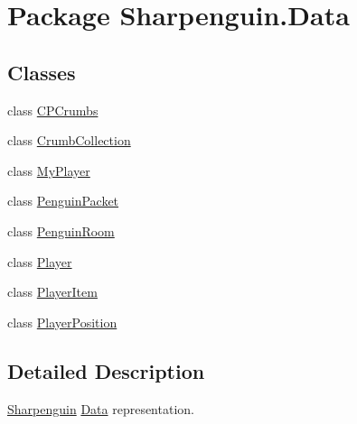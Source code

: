 \hypertarget{namespaceSharpenguin_1_1Data}{\section{\-Package \-Sharpenguin.\-Data}
\label{namespaceSharpenguin_1_1Data}
}
\subsection*{\-Classes}
\begin{DoxyCompactItemize}
\item 
class \hyperlink{classSharpenguin_1_1Data_1_1CPCrumbs}{\-C\-P\-Crumbs}
\item 
class \hyperlink{classSharpenguin_1_1Data_1_1CrumbCollection}{\-Crumb\-Collection}
\item 
class \hyperlink{classSharpenguin_1_1Data_1_1MyPlayer}{\-My\-Player}
\item 
class \hyperlink{classSharpenguin_1_1Data_1_1PenguinPacket}{\-Penguin\-Packet}
\item 
class \hyperlink{classSharpenguin_1_1Data_1_1PenguinRoom}{\-Penguin\-Room}
\item 
class \hyperlink{classSharpenguin_1_1Data_1_1Player}{\-Player}
\item 
class \hyperlink{classSharpenguin_1_1Data_1_1PlayerItem}{\-Player\-Item}
\item 
class \hyperlink{classSharpenguin_1_1Data_1_1PlayerPosition}{\-Player\-Position}
\end{DoxyCompactItemize}


\subsection{\-Detailed \-Description}
\hyperlink{namespaceSharpenguin}{\-Sharpenguin} \hyperlink{namespaceSharpenguin_1_1Data}{\-Data} representation. 